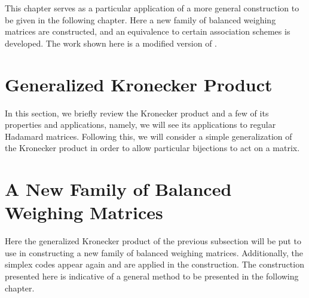 \documentclass[../../main]{subfiles}
\begin{document}
This chapter serves as a particular application of a more general construction
to be given in the following chapter. Here a new family of balanced weighing
matrices are constructed, and an equivalence to certain association schemes is
developed. The work shown here is a modified version of \cite{new-bw}. 

\fancyhf{}

\fancyhead[RO,LE]{\thepage}

 \section{\centering Generalized Kronecker Product}
 
 In this section, we briefly review the Kronecker product and a few of its
 properties and applications, namely, we will see its applications to regular
 Hadamard matrices. Following this, we will consider a simple generalization of
 the Kronecker product in order to allow particular bijections to act on a
 matrix. 
 
 \dinkus
 
 
 
 \fancyhf{}

 \fancyhead[RO,LE]{\thepage}

 \section{\centering A New Family of Balanced Weighing Matrices}
 
 Here the generalized Kronecker product of the previous subsection will be put
 to use in constructing a new family of balanced weighing matrices.
 Additionally, the simplex codes appear again and are applied in the
 construction. The construction presented here is indicative of a general method
 to be presented in the following chapter. 
 
 \dinkus
 
 
 
 \fancyhf{}

 \fancyhead[RO,LE]{\thepage}
\end{document}
